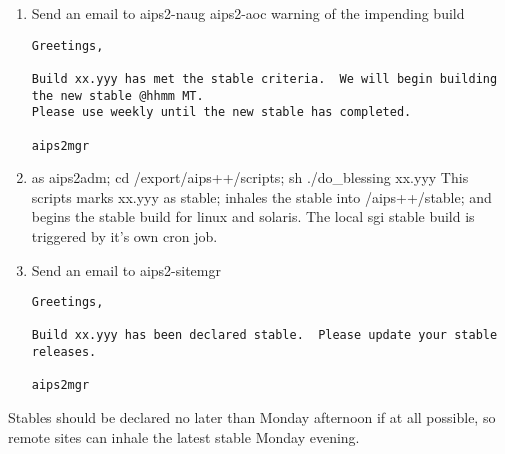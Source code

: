\begin{enumerate}
\item Send an email to aips2-naug aips2-aoc warning of the impending build
\begin{verbatim}
Greetings,

Build xx.yyy has met the stable criteria.  We will begin building the new stable @hhmm MT.
Please use weekly until the new stable has completed.

aips2mgr

\end{verbatim}
\item as aips2adm; cd /export/aips++/scripts; sh ./do\_blessing xx.yyy
This scripts marks xx.yyy as stable; inhales the stable into /aips++/stable; and begins the stable
build for linux and solaris.  The local sgi stable build is triggered by it's own cron job.
\item Send an email to aips2-sitemgr
\begin{verbatim}
Greetings,

Build xx.yyy has been declared stable.  Please update your stable releases.

aips2mgr
\end{verbatim}
\end{enumerate}

Stables should be declared no later than Monday afternoon if at all possible, so remote sites can
inhale the latest stable Monday evening.
